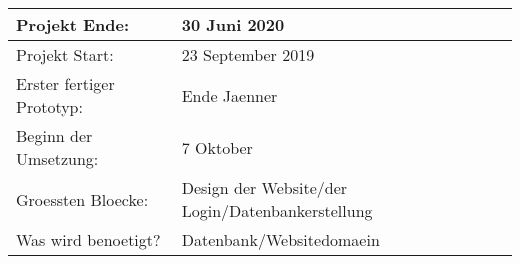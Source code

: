 \documentclass[12pt]{article}
\theoremstyle{definition}
\begin{document}
\newcommand{\projektend}{30 Juni 2020}
\newcommand{\projectstart}{23 September 2019}
\newcommand{\firstresult}{Ende Jaenner}
\newcommand{\beginofprog}{7 Oktober}
\newcommand{\bigBlocks}{Design der Website/der Login/Datenbankerstellung}
\newcommand{\whatisneeded}{Datenbank/Websitedomaein}

\begin{flushleft} 
\begin{tabular}{|l|l|}
\hline
Projekt Ende: & \projektend \\ \hline
Projekt Start: & \projectstart \\ \hline
Erster fertiger Prototyp: & \firstresult \\ \hline
Beginn der Umsetzung: & \beginofprog \\ \hline
Groessten Bloecke: & \bigBlocks \\ \hline
Was wird benoetigt? & \whatisneeded \\ \hline
\end{tabular}
\end{flushleft}
\cite{wikipedia_2016}
{}

\end{document}
